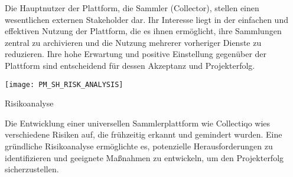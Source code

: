 Die Hauptnutzer der Plattform, die Sammler (Collector), stellen einen wesentlichen externen Stakeholder dar.
Ihr Interesse liegt in der einfachen und effektiven Nutzung der Plattform, die es ihnen ermöglicht, ihre Sammlungen zentral zu archivieren und die Nutzung mehrerer vorheriger Dienste zu reduzieren.
Ihre hohe Erwartung und positive Einstellung gegenüber der Plattform sind entscheidend für dessen Akzeptanz und Projekterfolg. \par


\begin{table}[h!]
    \centering
    \texttt{[image: PM\_SH\_RISK\_ANALYSIS]}
    \caption{Risikoanalyse}\label{tab:risikoanalyse}
\end{table}

Die Entwicklung einer universellen Sammlerplattform wie Collectiqo wies verschiedene Risiken auf, die frühzeitig erkannt und gemindert wurden.
Eine gründliche Risikoanalyse ermöglichte es, potenzielle Herausforderungen zu identifizieren und geeignete Maßnahmen zu entwickeln, um den Projekterfolg sicherzustellen.

